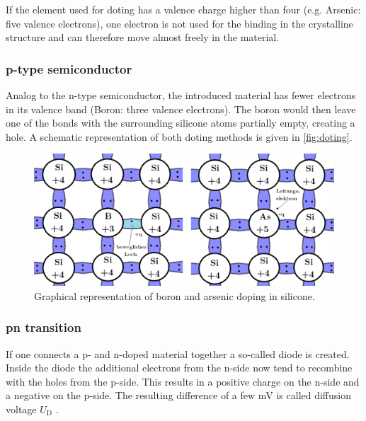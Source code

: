 If the element used for doting has a valence charge higher than four (e.g. Arsenic: five valence electrons), one electron is not used for the binding in the crystalline structure and can therefore move almost freely in the material. %

\subsubsection{p-type semiconductor}
Analog to the n-type semiconductor, the introduced material has fewer electrons in its valence band (Boron: three valence electrons). The boron would then leave one of the bonds with the surrounding silicone atoms partially empty, creating a hole.  A schematic representation of both doting methods is given in \autoref{fig:doting}.    %


\begin{figure}[H]
	\centering
	\includegraphics[width=0.7\linewidth]{Assets/doting.png}
	\caption{Graphical representation of boron and arsenic doping in silicone\cite{V15}.}
	\label{fig:doting}
\end{figure}


\subsubsection{pn transition}
If one connects a p- and n-doped material together a so-called diode is created. %
Inside the diode the additional electrons from the n-side now tend to recombine with the holes from the p-side. This results in a positive charge on the n-side and a negative on the p-side. The resulting difference of a few \unit{\milli\volt} is called diffusion voltage $U_\mathrm{D}$ \cite{V15}. \\

